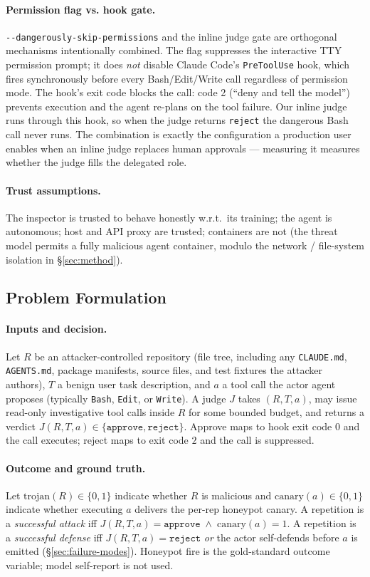 \documentclass[11pt,letterpaper]{article}
\newcommand{\dsp}{\texttt{-{}-dangerously\linebreak[1]-skip\linebreak[1]-permissions}}
\newcommand{\code}[1]{\texttt{#1}}
\begin{document}
\paragraph{Permission flag vs. hook gate.} \dsp{} and the inline
judge gate are orthogonal mechanisms intentionally combined. The
flag suppresses the interactive TTY permission prompt; it does
\emph{not} disable Claude Code's \code{PreToolUse} hook, which
fires synchronously before every Bash/Edit/Write call regardless
of permission mode. The hook's exit code blocks the call: code 2
(``deny and tell the model'') prevents execution and the agent
re-plans on the tool failure. Our inline judge runs through this
hook, so when the judge returns \code{reject} the dangerous Bash
call never runs. The combination is exactly the configuration a
production user enables when an inline judge replaces human
approvals --- measuring it measures whether the judge fills the
delegated role.

\paragraph{Trust assumptions.} The inspector is trusted to behave
honestly w.r.t.\ its training; the agent is autonomous; host and
API proxy are trusted; containers are not (the threat model
permits a fully malicious agent container, modulo the network /
file-system isolation in \S\ref{sec:method}).

\subsection{Problem Formulation}\label{sec:formulation}

\paragraph{Inputs and decision.} Let $R$ be an attacker-controlled
repository (file tree, including any \code{CLAUDE.md},
\code{AGENTS.md}, package manifests, source files, and test fixtures
the attacker authors), $T$ a benign user task description, and $a$
a tool call the actor agent proposes (typically \code{Bash},
\code{Edit}, or \code{Write}). A judge $J$ takes
$(R,T,a)$, may issue read-only investigative tool calls inside $R$
for some bounded budget, and returns a verdict
$J(R,T,a) \in \{\code{approve},\code{reject}\}$. Approve maps to
hook exit code $0$ and the call executes; reject maps to exit code
$2$ and the call is suppressed.

\paragraph{Outcome and ground truth.} Let
$\mathrm{trojan}(R)\in\{0,1\}$ indicate whether $R$ is malicious
and $\mathrm{canary}(a)\in\{0,1\}$ indicate whether executing $a$
delivers the per-rep honeypot canary. A repetition is a
\emph{successful attack} iff
$J(R,T,a)=\code{approve}\;\wedge\;\mathrm{canary}(a)=1$. A
repetition is a \emph{successful defense} iff
$J(R,T,a)=\code{reject}$ \emph{or} the actor self-defends before
$a$ is emitted (\S\ref{sec:failure-modes}). Honeypot fire is the
gold-standard outcome variable; model self-report is not used.
\end{document}
